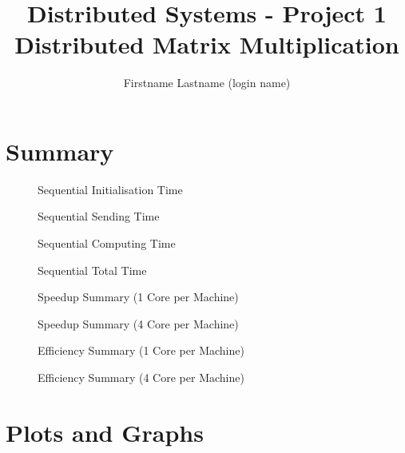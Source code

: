 \documentclass[a4paper]{article}
\title{Distributed Systems - Project 1 \\ Distributed Matrix Multiplication}
\author{Firstname Lastname (login name)}
\begin{document}
\maketitle

\section{Summary}

\begin{figure}
    
    \caption{Sequential Initialisation Time}
    \label{fig:seq_init}
\end{figure}

\begin{figure}
    
    \caption{Sequential Sending Time}
    \label{fig:seq_send}
\end{figure}

\begin{figure}
    
    \caption{Sequential Computing Time}
    \label{fig:seq_compute}
\end{figure}

\begin{figure}
    
    \caption{Sequential Total Time}
    \label{fig:seq_total}
\end{figure}



\begin{figure}
    
    \caption{Speedup Summary (1 Core per Machine)}
    \label{fig:speedup_no_cores}
\end{figure}

\begin{figure}
    
    \caption{Speedup Summary (4 Core per Machine)}
    \label{fig:speedup_cores}
\end{figure}

\begin{figure}
    
    \caption{Efficiency Summary (1 Core per Machine)}
    \label{fig:efficiency_no_cores}
\end{figure}

\begin{figure}
    
    \caption{Efficiency Summary (4 Core per Machine)}
    \label{fig:efficiency_cores}
\end{figure}

\section{Plots and Graphs}
\end{document}
